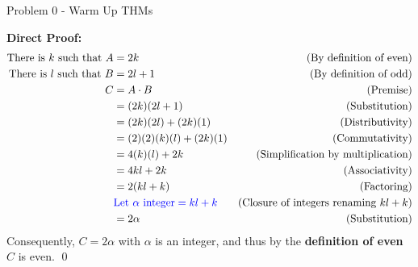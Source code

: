 \begin{problem}{Problem 0 - Warm Up THMs}
\begin{highlight}
        \textbf{Direct Proof:} \newline
        \begin{align*}
            \text{There is $k$ such that } A & = 2k & \text{(By definition of even)} \\
            \text{There is $l$ such that } B & = 2l + 1 & \text{(By definition of odd)} \\
            C & = A \cdot B & \text{(Premise)} \\
            & = (2k)(2l + 1) & \text{(Substitution)} \\
            & = (2k)(2l) + (2k)(1) & \text{(Distributivity)} \\
            & = (2)(2)(k)(l) + (2k)(1) & \text{(Commutativity)} \\
            & = 4(k)(l) + 2k & \text{(Simplification by multiplication)} \\
            & = 4kl + 2k & \text{(Associativity)} \\
            & = 2(kl + k) & \text{(Factoring)} \\
            & \textcolor{blue}{\text{Let } \alpha \text{ integer} = kl + k} & \text{(Closure of integers renaming $kl + k$)} \\
            & = 2\alpha & \text{(Substitution)} \\
        \end{align*}
        Consequently, $C = 2\alpha$ with $\alpha$ is an integer, and thus by the \textbf{definition of even} $C$ is even. \qed
    \end{highlight}
\end{problem}


